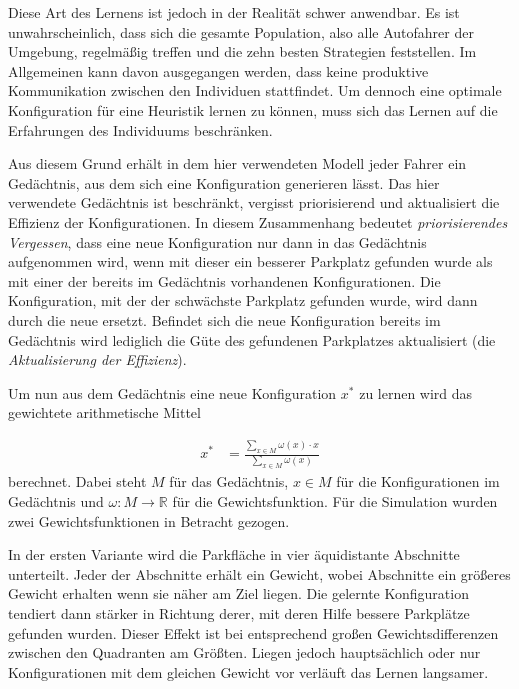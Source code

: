Diese Art des Lernens ist jedoch in der Realität schwer anwendbar. Es ist unwahrscheinlich, dass sich die gesamte Population, also alle Autofahrer der Umgebung, regelmäßig treffen und die zehn besten Strategien feststellen. Im Allgemeinen kann davon ausgegangen werden, dass keine produktive Kommunikation zwischen den Individuen stattfindet. Um dennoch eine optimale Konfiguration für eine Heuristik lernen zu können, muss sich das Lernen auf die Erfahrungen des Individuums beschränken. 

Aus diesem Grund erhält in dem hier verwendeten Modell jeder Fahrer ein Gedächtnis, aus dem sich eine Konfiguration generieren lässt. Das hier verwendete Gedächtnis ist beschränkt, vergisst priorisierend und aktualisiert die Effizienz der Konfigurationen. In diesem Zusammenhang bedeutet \emph{priorisierendes Vergessen}, dass eine neue Konfiguration nur dann in das Gedächtnis aufgenommen wird, wenn mit dieser ein besserer Parkplatz gefunden wurde als mit einer der bereits im Gedächtnis vorhandenen Konfigurationen. Die Konfiguration, mit der der schwächste Parkplatz gefunden wurde, wird dann durch die neue ersetzt. Befindet sich die neue Konfiguration bereits im Gedächtnis wird lediglich die Güte des gefundenen Parkplatzes aktualisiert (die \emph{Aktualisierung der Effizienz}).

Um nun aus dem Gedächtnis eine neue Konfiguration $x^*$ zu lernen wird das gewichtete arithmetische Mittel 

\begin{align}
	x^{*} &= \frac{\sum\limits_{x \in M} \omega (x) \cdot x}{\sum\limits_{x \in M} \omega (x)}\label{form_gelernterParameter}
\end{align}
 berechnet. Dabei steht $M$ für das Gedächtnis, $x\in M$ für die Konfigurationen im Gedächtnis und $\omega : M \rightarrow \mathbb{R}$ für die Gewichtsfunktion. Für die Simulation wurden zwei Gewichtsfunktionen in Betracht gezogen.

In der ersten Variante wird die Parkfläche in vier äquidistante Abschnitte unterteilt. Jeder der Abschnitte erhält ein Gewicht, wobei Abschnitte ein größeres Gewicht erhalten wenn sie näher am Ziel liegen. Die gelernte Konfiguration tendiert dann stärker in Richtung derer, mit deren Hilfe bessere Parkplätze gefunden wurden. Dieser Effekt ist bei entsprechend großen Gewichtsdifferenzen zwischen den Quadranten am Größten. Liegen jedoch hauptsächlich oder nur Konfigurationen mit dem gleichen Gewicht vor verläuft das Lernen langsamer. 

